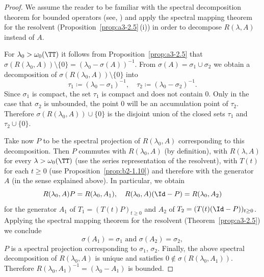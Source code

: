 \begin{proof}
We assume the reader to be familiar with the spectral decomposition theorem for bounded operators (see, \eg \textcite[p.572]{dunfordschwartz:1958}) and apply the spectral mapping theorem for the resolvent (Proposition~\ref{prop:a3-2.5}\,(i)) in order to decompose $R(\lambda,A)$ instead of\/ $A$.

For $\lambda_{0} > \omega_{0}(\TT)$ it follows from Proposition~\ref{prop:a3-2.5} that $\sigma(R(\lambda_{0},A)) \setminus \{0\} = (\lambda_{0} - \sigma(A))^{-1}$.
From $\sigma(A) = \sigma_{1} \cup \sigma_{2}$ we obtain a decomposition of\/ $\sigma(R(\lambda_{0},A)) \setminus \{0\}$ into
\[
	\tau_{1} \coloneq (\lambda_{0} - \sigma_{1})^{-1}, 
		\quad 
	\tau_{2} \coloneq (\lambda_{0} - \sigma_{2})^{-1} .
\]
Since $\sigma_{1}$ is compact, the set $\tau_{1}$ is compact and does not contain $0$.
Only in the case that $\sigma_{2}$ is unbounded, the point $0$ will be an accumulation point of\/ $\tau_{2}$.
Therefore $\sigma(R(\lambda_{0},A)) \cup \{0\}$ is the disjoint union of the closed sets $\tau_{1}$ and $\tau_{2} \cup \{0\}$.

Take now $P$ to be the spectral projection of\/ $R(\lambda_{0},A)$ corresponding to this decomposition.
Then $P$ commutes with $R(\lambda_{0},A)$ (by definition), with $R(\lambda,A)$ for every $\lambda > \omega_{0}(\TT)$ (use the series representation of the resolvent), with $T(t)$ for each $t \geq 0$ (use Proposition~\ref{prop:b2-1.10}) and therefore with the generator $A$ (in the sense explained above).
In particular, we obtain
\begin{equation*}\label{eq:a3-new}
R(\lambda_{0},A)P = R(\lambda_{0},A_{1}), \quad R(\lambda_{0},A)(\Id-P) = R(\lambda_{0},A_{2})
\end{equation*}
for the generator $A_{1}$ of\/ $T_{1} = (T(t)P)_{t \geq 0}$ and $A_{2}$ of\/ $T_{2} = (T(t)(\Id-P))_{t \geq 0}$.
Applying the spectral mapping theorem for the resolvent (Theorem~\ref{prop:a3-2.5})
we conclude
\[
\sigma(A_{1}) = \sigma_{1} \text{ and } \sigma(A_{2}) = \sigma_{2} ,
\]
\ie $P$ is a spectral projection corresponding to $\sigma_{1}$, $\sigma_{2}$.
Finally, the above spectral decomposition of\/ $R(\lambda_{0},A)$ is unique and satisfies $0 \notin \sigma(R(\lambda_{0},A_{1}))$.
Therefore $R(\lambda_{0},A_{1})^{-1} = (\lambda_{0}-A_{1})$ is bounded.
\end{proof}
